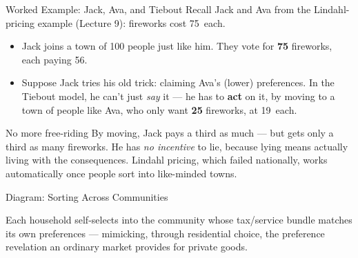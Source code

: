 \documentclass[11pt,aspectratio=169]{beamer}
\begin{document}
\begin{frame}{Worked Example: Jack, Ava, and Tiebout}
  Recall Jack and Ava from the Lindahl-pricing example (Lecture 9): fireworks cost 75\textcent\ each.
  \begin{itemize}
    \item Jack joins a town of 100 people just like him. They vote for \textbf{75} fireworks, each paying 56\textcent.
    \item Suppose Jack tries his old trick: claiming Ava's (lower) preferences. In the Tiebout model, he can't just \emph{say} it --- he has to \textbf{act} on it, by moving to a town of people like Ava, who only want \textbf{25} fireworks, at 19\textcent\ each.
  \end{itemize}
  \begin{alertblock}{No more free-riding}
    By moving, Jack pays a third as much --- but gets only a third as many fireworks. He has \emph{no incentive} to lie, because lying means actually living with the consequences. Lindahl pricing, which failed nationally, works automatically once people sort into like-minded towns.
  \end{alertblock}
\end{frame}

\begin{frame}{Diagram: Sorting Across Communities}
  \begin{center}
  \end{center}
  \footnotesize Each household self-selects into the community whose tax/service bundle matches its own preferences --- mimicking, through residential choice, the preference revelation an ordinary market provides for private goods.
\end{frame}
\end{document}
